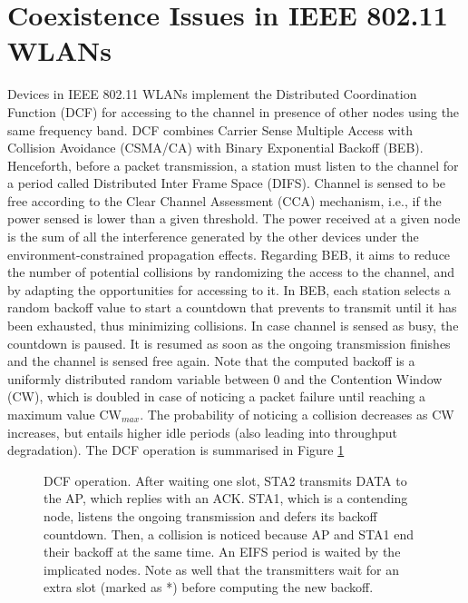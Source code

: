 \documentclass[12pt, a4paper,twoside]{tesi_upf}
\begin{document}
		\section{Coexistence Issues in IEEE 802.11 WLANs}
		\label{section:coexistence_issues}	
			Devices in IEEE 802.11 WLANs implement the Distributed Coordination Function (DCF) for accessing to the channel in presence of other nodes using the same frequency band. DCF combines Carrier Sense Multiple Access with Collision Avoidance (CSMA/CA) with Binary Exponential Backoff (BEB). Henceforth, before a packet transmission, a station must listen to the channel for a period called Distributed Inter Frame Space (DIFS). Channel is sensed to be free according to the Clear Channel Assessment (CCA) mechanism, i.e., if the power sensed is lower than a given threshold. The power received at a given node is the sum of all the interference generated by the other devices under the environment-constrained propagation effects. Regarding BEB, it aims to reduce the number of potential collisions by randomizing the access to the channel, and by adapting the opportunities for accessing to it. In BEB, each station selects a random backoff value to start a countdown that prevents to transmit until it has been exhausted, thus minimizing collisions. In case channel is sensed as busy, the countdown is paused. It is resumed as soon as the ongoing transmission finishes and the channel is sensed free again. Note that the computed backoff is a uniformly distributed random variable between 0 and the Contention Window (CW), which is doubled in case of noticing a packet failure until reaching a maximum value $\text{CW}_{max}$. The probability of noticing a collision decreases as CW increases, but entails higher idle periods (also leading into throughput degradation). The DCF operation is summarised in Figure \ref{fig:dcf_operation_1}			
			\begin{figure}[h!]
				\centering
				\caption{DCF operation. After waiting one slot, STA2 transmits DATA to the AP, which replies with an ACK. STA1, which is a contending node, listens the ongoing transmission and defers its backoff countdown. Then, a collision is noticed because AP and STA1 end their backoff at the same time. An EIFS period is waited by the implicated nodes. Note as well that the transmitters wait for an extra slot (marked as *) before computing the new backoff.}
				\label{fig:dcf_operation_1}
			\end{figure}
					
\end{document}
